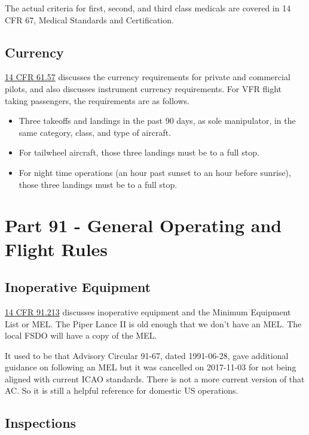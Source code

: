 The actual criteria for first, second, and third class medicals are covered in 14 CFR 67, Medical Standards and Certification.

\subsection{Currency}

\href{https://www.ecfr.gov/current/title-14/chapter-I/subchapter-D/part-61/subpart-A/section-61.57}{14 CFR 61.57} discusses the currency requirements for private and commercial pilots, and also discusses instrument currency requirements. For VFR flight taking passengers, the requirements are as follows.

\begin{itemize}
\item Three takeoffs and landings in the past 90 days, as sole manipulator, in the same category, class, and type of aircraft.
\item For tailwheel aircraft, those three landings must be to a full stop.
\item For night time operations (an hour past sunset to an hour before sunrise), those three landings must be to a full stop.

\end{itemize}

\section{Part 91 - General Operating and Flight Rules}

\subsection{Inoperative Equipment}

\href{https://www.ecfr.gov/current/title-14/chapter-I/subchapter-F/part-91/subpart-C/section-91.213}{14 CFR 91.213} discusses inoperative equipment and the Minimum Equipment List or MEL. The Piper Lance II is old enough that we don't have an MEL. The local FSDO will have a copy of the MEL.

It used to be that Advisory Circular 91-67, dated 1991-06-28, gave additional guidance on following an MEL but it was cancelled on 2017-11-03 for not being aligned with current ICAO standards. There is not a more current version of that AC. So it is still a helpful reference for domestic US operations.

\subsection{Inspections}

